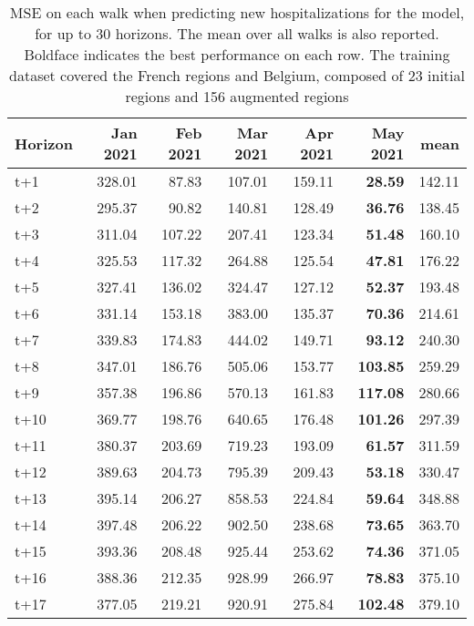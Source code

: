\begin{table}[H]
\centering
\caption{MSE on each walk when predicting new hospitalizations for the model, for up to 30 horizons. The mean over all walks is also reported. Boldface indicates the best performance on each row. The training dataset covered the French regions and Belgium, composed of 23 initial regions and 156 augmented regions }
\label{tab:MSE_walk_encoder_decoder}
\begin{tabular}{lrrrrrr}
\toprule
Horizon &  Jan 2021 &  Feb 2021 &  Mar 2021 &  Apr 2021 &  May 2021 &   mean \\
\midrule
t+1  & 328.01  & 87.83  & 107.01  & 159.11  & \textbf{28.59}  & 142.11  \\
t+2  & 295.37  & 90.82  & 140.81  & 128.49  & \textbf{36.76}  & 138.45  \\
t+3  & 311.04  & 107.22  & 207.41  & 123.34  & \textbf{51.48}  & 160.10  \\
t+4  & 325.53  & 117.32  & 264.88  & 125.54  & \textbf{47.81}  & 176.22  \\
t+5  & 327.41  & 136.02  & 324.47  & 127.12  & \textbf{52.37}  & 193.48  \\
t+6  & 331.14  & 153.18  & 383.00  & 135.37  & \textbf{70.36}  & 214.61  \\
t+7  & 339.83  & 174.83  & 444.02  & 149.71  & \textbf{93.12}  & 240.30  \\
t+8  & 347.01  & 186.76  & 505.06  & 153.77  & \textbf{103.85}  & 259.29  \\
t+9  & 357.38  & 196.86  & 570.13  & 161.83  & \textbf{117.08}  & 280.66  \\
t+10  & 369.77  & 198.76  & 640.65  & 176.48  & \textbf{101.26}  & 297.39  \\
t+11  & 380.37  & 203.69  & 719.23  & 193.09  & \textbf{61.57}  & 311.59  \\
t+12  & 389.63  & 204.73  & 795.39  & 209.43  & \textbf{53.18}  & 330.47  \\
t+13  & 395.14  & 206.27  & 858.53  & 224.84  & \textbf{59.64}  & 348.88  \\
t+14  & 397.48  & 206.22  & 902.50  & 238.68  & \textbf{73.65}  & 363.70  \\
t+15  & 393.36  & 208.48  & 925.44  & 253.62  & \textbf{74.36}  & 371.05  \\
t+16  & 388.36  & 212.35  & 928.99  & 266.97  & \textbf{78.83}  & 375.10  \\
t+17  & 377.05  & 219.21  & 920.91  & 275.84  & \textbf{102.48}  & 379.10  \\

\end{tabular}
\end{table}

